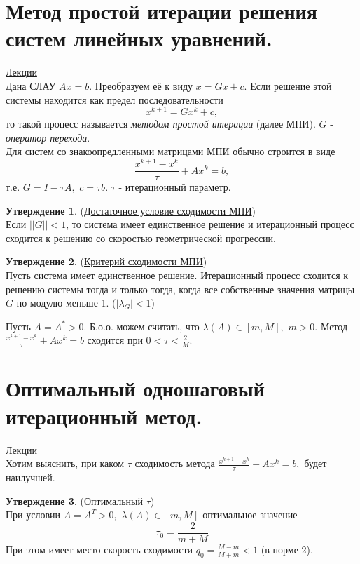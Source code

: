 \documentclass[specialist, subf, href, colorlinks=true, 12pt, times, mtpro, final]{disser}
\theoremstyle{definition}
\newtheorem{state}{Утверждение}[section]
\begin{document}
{\section {Метод простой итерации решения систем линейных уравнений.}
    \hyperlink {lects.58}{Лекции}\\
    Дана СЛАУ $Ax = b$. Преобразуем её к виду $x = Gx + c$. Если решение этой системы находится как предел последовательности
    $$
        x^{k+1} = Gx^{k} + c,
    $$
    то такой процесс называется {\it методом простой итерации} (далее МПИ). $G$ - {\it оператор перехода}.\\
    Для систем со знакоопредленными матрицами МПИ обычно строится в виде
    $$
        \frac{x^{k+1} - x^{k}}{\tau} + Ax^{k} = b,
    $$
    т.е. $G = I - \tau A, \,\, c = \tau b$. $\tau$ - итерационный параметр.
    \begin{state} (\hyperlink {lects.58}{Достаточное условие сходимости МПИ})\\
    Если $||G|| < 1$, то система имеет единственное решение и итерационный процесс сходится
    к решению со скоростью геометрической прогрессии.
    \end{state}
    \begin{state} (\hyperlink {lects.59}{Критерий сходимости МПИ})\\
    Пусть система имеет единственное решение. Итерационный процесс сходится к решению системы тогда и только тогда, когда все собственные значения матрицы $G$ по модулю меньше 1. ($|\lambda_{G}| < 1$)
    \end{state}
    Пусть $A = A^* > 0$. Б.о.о. можем считать, что $\lambda(A) \in [m, M],\,\, m > 0$.
    Метод $ \frac{x^{k+1} - x^{k}}{\tau} + Ax^{k} = b$ сходится при $0 < \tau < \frac{2}{M}$.

\section {Оптимальный одношаговый итерационный метод.}
    \hyperlink {lects.60}{Лекции}\\
    Хотим выяснить, при каком $\tau$ сходимость метода
    $\frac{x^{k+1} - x^{k}}{\tau} + Ax^{k} = b,$ будет наилучшей.
    \begin{state} (\hyperlink {lects.60}{Оптимальный $\tau$})\\
    При условии $A = A^T > 0, \,\, \lambda(A) \in [m, M]$ оптимальное значение
    $$\tau_0 = \frac{2}{m+M}$$
    При этом имеет место скорость сходимости $q_0 = \frac{M-m}{M+m} < 1$ (в норме 2).
    \end{state}

}
\end{document}
